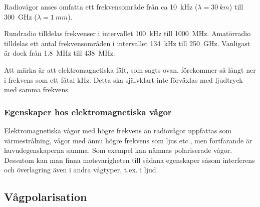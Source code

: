 Radiovågor anses omfatta ett frekvensområde från ca 10~kHz
(\(\lambda = \SI{30}{km}\)) till \SI{300}{GHz} (\(\lambda = \SI{1}{mm}\)).

Rundradio tilldelas frekvenser i intervallet \SI{100}{kHz} till \SI{1000}{MHz}.
Amatörradio tilldelas ett antal frekvensområden i intervallet \SI{134}{kHz} till
\SI{250}{GHz}. Vanligast är dock från \SI{1,8}{MHz} till \SI{438}{MHz}.

Att märka är att elektromagnetiska fält, som sagts ovan, förekommer så långt
ner i frekvens som ett fåtal kHz.
Detta ska självklart inte förväxlas med ljudtryck med samma frekvens.

\subsubsection{Egenskaper hos elektromagnetiska vågor}

Elektromagnetiska vågor med högre frekvens än radiovågor uppfattas som
värmestrålning, vågor med ännu högre frekvens som ljus etc., men fortfarande är
huvudegenskaperna samma.
Som exempel kan nämnas polariserade vågor.
Dessutom kan man finna motsvarigheten till sådana egenskaper såsom interferens och
överlagring även i andra vågtyper, t.ex. i ljud.

\subsection{Vågpolarisation}
\label{vågpolarisation}

